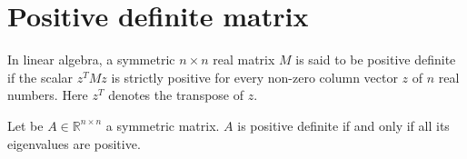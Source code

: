 \section{Positive definite matrix}
In linear algebra, a symmetric \( n \times n \) real matrix \( M \) is said to be positive definite if the scalar \( z^TMz \) is strictly positive for every non-zero column vector \( z \) of \( n \) real numbers. Here \( z^T \) denotes the transpose of \( z \).

Let be \( A \in \mathbb{R}^{n \times n} \) a symmetric matrix. \( A \) is positive definite if and only if all its eigenvalues are positive.


